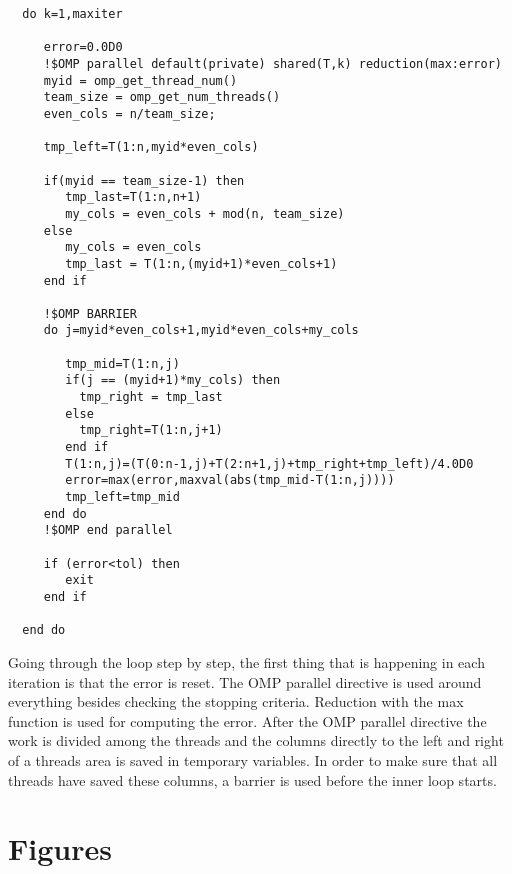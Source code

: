 \documentclass[a4paper, 12pt]{article}
\begin{document}
\begin{lstlisting}
  do k=1,maxiter
     
     error=0.0D0
     !$OMP parallel default(private) shared(T,k) reduction(max:error)
     myid = omp_get_thread_num()
     team_size = omp_get_num_threads()
     even_cols = n/team_size;

     tmp_left=T(1:n,myid*even_cols)

     if(myid == team_size-1) then
        tmp_last=T(1:n,n+1)
        my_cols = even_cols + mod(n, team_size)
     else 
        my_cols = even_cols
        tmp_last = T(1:n,(myid+1)*even_cols+1)
     end if

     !$OMP BARRIER
     do j=myid*even_cols+1,myid*even_cols+my_cols

        tmp_mid=T(1:n,j)
        if(j == (myid+1)*my_cols) then
          tmp_right = tmp_last
        else
          tmp_right=T(1:n,j+1)
        end if
        T(1:n,j)=(T(0:n-1,j)+T(2:n+1,j)+tmp_right+tmp_left)/4.0D0
        error=max(error,maxval(abs(tmp_mid-T(1:n,j))))
        tmp_left=tmp_mid
     end do
     !$OMP end parallel
     
     if (error<tol) then
        exit
     end if
     
  end do
\end{lstlisting}

Going through the loop step by step, the first thing that is happening in each
iteration is that the error is reset. The OMP parallel directive is used around
everything besides checking the stopping criteria. Reduction with the max
function is used for computing the error. After the OMP parallel directive the
work is divided among the threads and the columns directly to the left and right
of a threads area is saved in temporary variables. In order to make sure that
all threads have saved these columns, a barrier is used before the inner loop
starts.

\newpage
\appendix
\section{Figures}
\end{document}
